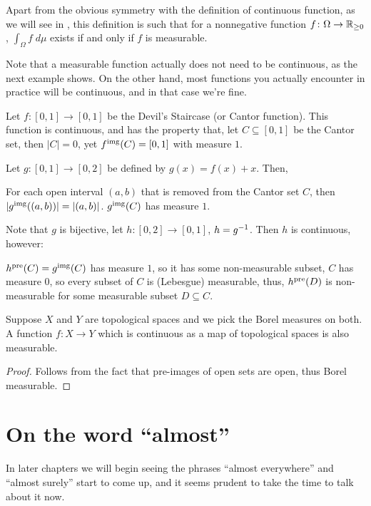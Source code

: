 Apart from the obvious symmetry with the definition of continuous function,
as we will see in , this definition is such that
for a nonnegative function $f \colon \Omega \to \mathbb R_{\geq 0}$,
$\int_\Omega f \; d\mu$ exists if and only if $f$ is measurable.

\begin{remark}
	Note that a measurable function actually does not need to be continuous,
	as the next example shows.
	On the other hand, most functions you actually encounter in practice will be continuous,
	and in that case we're fine.
\end{remark}
\begin{example}
	Let $f \colon [0, 1] \to [0, 1]$ be the Devil's Staircase (or Cantor function).
	This function is continuous, and has the property that, let $C \subseteq [0, 1]$ be the Cantor set,
	then $|C| = 0$, yet $f^{\text{img}}(C) = [0, 1]$ with measure $1$.

	Let $g \colon [0, 1] \to [0, 2]$ be defined by $g(x) = f(x) + x$. Then,
	\begin{itemize}
		\ii For each open interval $(a, b)$ that is removed from the Cantor set $C$, then $|g^{\text{img}}((a,
		b))| = |(a, b)|$.
		\ii $g^{\text{img}}(C)$ has measure $1$.
	\end{itemize}

	Note that $g$ is bijective, let $h \colon [0, 2] \to [0, 1]$, $h = g^{-1}$. Then $h$ is continuous,
	however:
	\begin{itemize}
		\ii $h^{\text{pre}}(C) = g^{\text{img}}(C)$ has measure $1$, so it has some non-measurable subset,
		\ii $C$ has measure $0$, so every subset of $C$ is (Lebesgue) measurable,
		\ii thus, $h^{\text{pre}}(D)$ is non-measurable for some measurable subset $D \subseteq C$.
	\end{itemize}
\end{example}

\begin{proposition}
	Suppose $X$ and $Y$ are topological spaces
	and we pick the Borel measures on both.
	A function $f \colon X \to Y$
	which is continuous as a map of topological spaces is also measurable.
\end{proposition}
\begin{proof}
	Follows from the fact that pre-images of open sets are open, thus Borel measurable.
\end{proof}

\section{On the word ``almost''}
In later chapters we will begin seeing the phrases ``almost everywhere''
and ``almost surely'' start to come up,
and it seems prudent to take the time to talk about it now.

